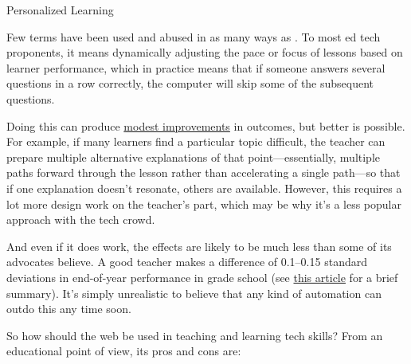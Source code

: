 \begin{aside}{Personalized Learning}

Few terms have been used and abused in as many ways as
. To most
ed tech proponents, it means dynamically adjusting the pace or focus
of lessons based on learner performance, which in practice means that
if someone answers several questions in a row correctly, the computer
will skip some of the subsequent questions.

Doing this can produce \href{https://www.rand.org/pubs/research\_briefs/RB9994.html}{modest
improvements} in outcomes, but
better is possible. For example, if many learners find a particular
topic difficult, the teacher can prepare multiple alternative
explanations of that point---essentially, multiple paths forward
through the lesson rather than accelerating a single path---so that
if one explanation doesn't resonate, others are available. However,
this requires a lot more design work on the teacher's part, which
may be why it's a less popular approach with the tech crowd.

And even if it does work, the effects are likely to be much less
than some of its advocates believe. A good teacher makes a
difference of 0.1--0.15 standard deviations in end-of-year
performance in grade school \cite{Chet2014} (see \href{http://educationnext.org/in-schools-teacher-quality-matters-most-coleman/}{this
article} for a brief summary). It's simply
unrealistic to believe that any kind of automation can outdo this
any time soon.

\end{aside}

So how should the web be used in teaching and learning tech skills? From
an educational point of view, its pros and cons are:

